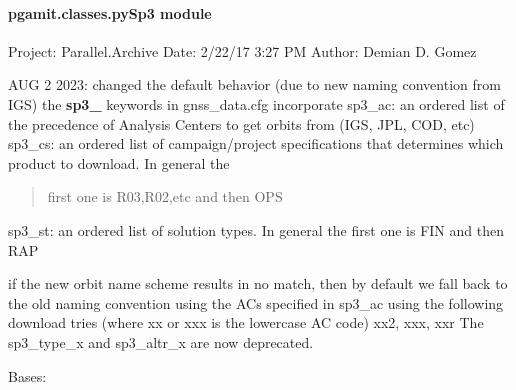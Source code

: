 \documentclass[letterpaper,10pt,english]{sphinxmanual}
\begin{document}
\paragraph{pgamit.classes.pySp3 module}
\label{\detokenize{pgamit.classes:module-pgamit.classes.pySp3}}\label{\detokenize{pgamit.classes:pgamit-classes-pysp3-module}}
\sphinxAtStartPar
Project: Parallel.Archive
Date: 2/22/17 3:27 PM
Author: Demian D. Gomez

\sphinxAtStartPar
AUG 2 2023: changed the default behavior (due to new naming convention from IGS)
the {\color{red}\bfseries{}sp3\_} keywords in gnss\_data.cfg incorporate
sp3\_ac: an ordered list of the precedence of Analysis Centers to get orbits from (IGS, JPL, COD, etc)
sp3\_cs: an ordered list of campaign/project specifications that determines which product to download. In general the
\begin{quote}

\sphinxAtStartPar
first one is R03,R02,etc and then OPS
\end{quote}

\sphinxAtStartPar
sp3\_st: an ordered list of solution types. In general the first one is FIN and then RAP

\sphinxAtStartPar
if the new orbit name scheme results in no match, then by default we fall back to the old naming convention using the
ACs specified in sp3\_ac using the following download tries (where xx or xxx is the lowercase AC code) xx2, xxx, xxr
The sp3\_type\_x and sp3\_altr\_x are now deprecated.

\begin{fulllineitems}
\label{\detokenize{pgamit.classes:pgamit.classes.pySp3.GetSp3Orbits}}
\pysigstartsignatures
\pysiglinewithargsret
{}
{\sphinxparamcomma {}\sphinxparamcomma {}\sphinxparamcomma {}\sphinxparamcomma {}}
{}
\pysigstopsignatures
\sphinxAtStartPar
Bases: {\hyperref[\detokenize{pgamit.classes:pgamit.classes.pyProducts.OrbitalProduct}]{}}

\begin{fulllineitems}
\label{\detokenize{pgamit.classes:pgamit.classes.pySp3.GetSp3Orbits.cleanup}}
\pysigstartsignatures
\pysiglinewithargsret
{}
{}
{}
\pysigstopsignatures
\end{fulllineitems}


\end{fulllineitems}
\end{document}
